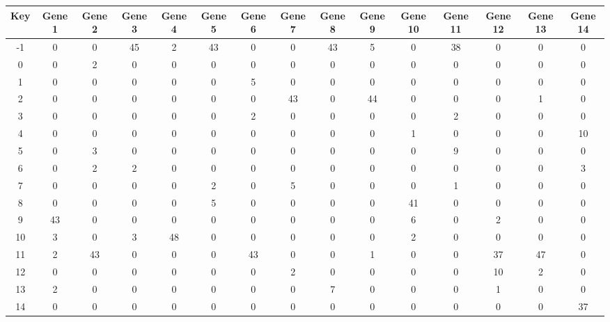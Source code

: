 \begin{tabular}{|c|c|c|c|c|c|c|c|c|c|c|c|c|c|c|}
\hline
Key & Gene 1 & Gene 2 & Gene 3 & Gene 4 & Gene 5 & Gene 6 & Gene 7 & Gene 8 & Gene 9 & Gene 10 & Gene 11 & Gene 12 & Gene 13 & Gene 14 \\
\hline
-1 & 0 & 0 & 45 & 2 & 43 & 0 & 0 & 43 & 5 & 0 & 38 & 0 & 0 & 0 \\
0 & 0 & 2 & 0 & 0 & 0 & 0 & 0 & 0 & 0 & 0 & 0 & 0 & 0 & 0 \\
1 & 0 & 0 & 0 & 0 & 0 & 5 & 0 & 0 & 0 & 0 & 0 & 0 & 0 & 0 \\
2 & 0 & 0 & 0 & 0 & 0 & 0 & 43 & 0 & 44 & 0 & 0 & 0 & 1 & 0 \\
3 & 0 & 0 & 0 & 0 & 0 & 2 & 0 & 0 & 0 & 0 & 2 & 0 & 0 & 0 \\
4 & 0 & 0 & 0 & 0 & 0 & 0 & 0 & 0 & 0 & 1 & 0 & 0 & 0 & 10 \\
5 & 0 & 3 & 0 & 0 & 0 & 0 & 0 & 0 & 0 & 0 & 9 & 0 & 0 & 0 \\
6 & 0 & 2 & 2 & 0 & 0 & 0 & 0 & 0 & 0 & 0 & 0 & 0 & 0 & 3 \\
7 & 0 & 0 & 0 & 0 & 2 & 0 & 5 & 0 & 0 & 0 & 1 & 0 & 0 & 0 \\
8 & 0 & 0 & 0 & 0 & 5 & 0 & 0 & 0 & 0 & 41 & 0 & 0 & 0 & 0 \\
9 & 43 & 0 & 0 & 0 & 0 & 0 & 0 & 0 & 0 & 6 & 0 & 2 & 0 & 0 \\
10 & 3 & 0 & 3 & 48 & 0 & 0 & 0 & 0 & 0 & 2 & 0 & 0 & 0 & 0 \\
11 & 2 & 43 & 0 & 0 & 0 & 43 & 0 & 0 & 1 & 0 & 0 & 37 & 47 & 0 \\
12 & 0 & 0 & 0 & 0 & 0 & 0 & 2 & 0 & 0 & 0 & 0 & 10 & 2 & 0 \\
13 & 2 & 0 & 0 & 0 & 0 & 0 & 0 & 7 & 0 & 0 & 0 & 1 & 0 & 0 \\
14 & 0 & 0 & 0 & 0 & 0 & 0 & 0 & 0 & 0 & 0 & 0 & 0 & 0 & 37 \\
\hline
\end{tabular}